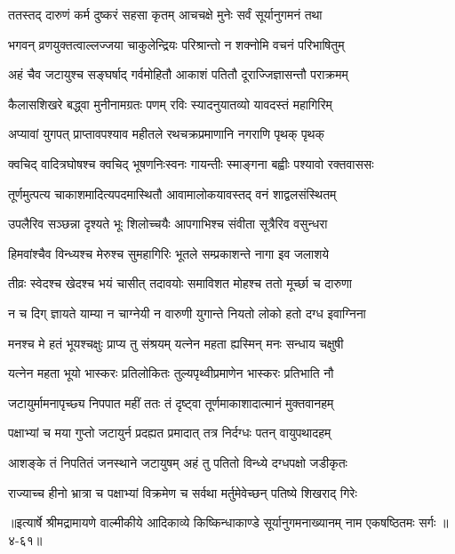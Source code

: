 
\twolineshloka
{ततस्तद् दारुणं कर्म दुष्करं सहसा कृतम्}
{आचचक्षे मुनेः सर्वं सूर्यानुगमनं तथा} %

\twolineshloka
{भगवन् व्रणयुक्तत्वाल्लज्जया चाकुलेन्द्रियः}
{परिश्रान्तो न शक्नोमि वचनं परिभाषितुम्} %

\twolineshloka
{अहं चैव जटायुश्च सङ्घर्षाद् गर्वमोहितौ}
{आकाशं पतितौ दूराज्जिज्ञासन्तौ पराक्रमम्} %

\twolineshloka
{कैलासशिखरे बद्ध्वा मुनीनामग्रतः पणम्}
{रविः स्यादनुयातव्यो यावदस्तं महागिरिम्} %

\twolineshloka
{अप्यावां युगपत् प्राप्तावपश्याव महीतले}
{रथचक्रप्रमाणानि नगराणि पृथक् पृथक्} %

\twolineshloka
{क्वचिद् वादित्रघोषश्च क्वचिद् भूषणनिःस्वनः}
{गायन्तीः स्माङ्गना बह्वीः पश्यावो रक्तवाससः} %

\twolineshloka
{तूर्णमुत्पत्य चाकाशमादित्यपदमास्थितौ}
{आवामालोकयावस्तद् वनं शाद्वलसंस्थितम्} %

\twolineshloka
{उपलैरिव सञ्छन्ना दृश्यते भूः शिलोच्चयैः}
{आपगाभिश्च संवीता सूत्रैरिव वसुन्धरा} %

\twolineshloka
{हिमवांश्चैव विन्ध्यश्च मेरुश्च सुमहागिरिः}
{भूतले सम्प्रकाशन्ते नागा इव जलाशये} %

\twolineshloka
{तीव्रः स्वेदश्च खेदश्च भयं चासीत् तदावयोः}
{समाविशत मोहश्च ततो मूर्च्छा च दारुणा} %

\twolineshloka
{न च दिग् ज्ञायते याम्या न चाग्नेयी न वारुणी}
{युगान्ते नियतो लोको हतो दग्ध इवाग्निना} %

\twolineshloka
{मनश्च मे हतं भूयश्चक्षुः प्राप्य तु संश्रयम्}
{यत्नेन महता ह्यस्मिन् मनः सन्धाय चक्षुषी} %

\twolineshloka
{यत्नेन महता भूयो भास्करः प्रतिलोकितः}
{तुल्यपृथ्वीप्रमाणेन भास्करः प्रतिभाति नौ} %

\twolineshloka
{जटायुर्मामनापृच्छ्य निपपात महीं ततः}
{तं दृष्ट्वा तूर्णमाकाशादात्मानं मुक्तवानहम्} %

\twolineshloka
{पक्षाभ्यां च मया गुप्तो जटायुर्न प्रदह्यत}
{प्रमादात् तत्र निर्दग्धः पतन् वायुपथादहम्} %

\twolineshloka
{आशङ्के तं निपतितं जनस्थाने जटायुषम्}
{अहं तु पतितो विन्ध्ये दग्धपक्षो जडीकृतः} %

\twolineshloka
{राज्याच्च हीनो भ्रात्रा च पक्षाभ्यां विक्रमेण च}
{सर्वथा मर्तुमेवेच्छन् पतिष्ये शिखराद् गिरेः} %


॥इत्यार्षे श्रीमद्रामायणे वाल्मीकीये आदिकाव्ये किष्किन्धाकाण्डे सूर्यानुगमनाख्यानम् नाम एकषष्ठितमः सर्गः ॥४-६१॥
